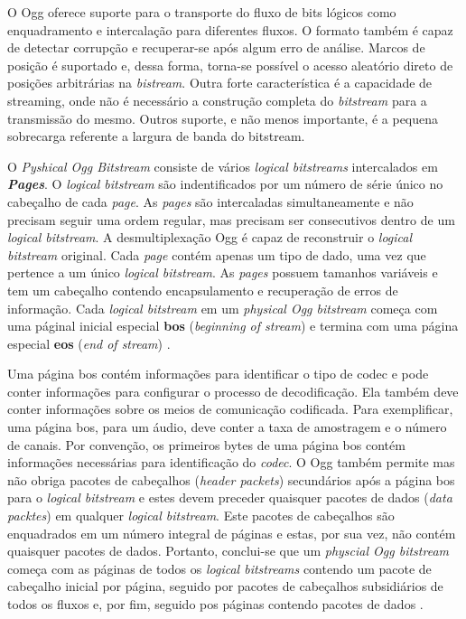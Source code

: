 O Ogg oferece suporte para o transporte do fluxo de bits lógicos como enquadramento e intercalação para diferentes fluxos. O formato também é capaz de detectar corrupção e recuperar-se após algum erro de análise. Marcos de posição é suportado e, dessa forma, torna-se possível o acesso aleatório direto de posições arbitrárias na \textit{bistream}. Outra forte característica é a capacidade de streaming, onde não é necessário a construção completa do \textit{bitstream} para a transmissão do mesmo. Outros suporte, e não menos importante, é a pequena sobrecarga referente a largura de banda do bitstream.

O \textit{Pyshical Ogg Bitstream} consiste de vários \textit{logical bitstreams} intercalados em \textbf{\textit{Pages}}. O \textit{logical bitstream}  são indentificados por um número de série único no cabeçalho de cada \textit{page}. As \textit{pages} são intercaladas simultaneamente e não precisam seguir uma ordem regular, mas precisam ser consecutivos dentro de um \textit{logical bitstream}. A desmultiplexação Ogg é capaz de reconstruir o \textit{logical bitstream} original. Cada \textit{page} contém apenas um tipo de dado, uma vez que pertence a um único \textit{logical bitstream}. As \textit{pages} possuem tamanhos variáveis e tem um cabeçalho contendo encapsulamento e recuperação de erros de informação. Cada \textit{logical bitstream} em um \textit{physical Ogg bitstream} começa com uma páginal inicial especial \textbf{bos} (\textit{beginning of stream}) e termina com uma página especial \textbf{eos} (\textit{end of stream}) \cite{ogg}.

Uma página bos contém informações para identificar o tipo de codec e pode conter informações para configurar o processo de decodificação. Ela também deve conter informações sobre os meios de comunicação codificada. Para exemplificar, uma página bos, para um áudio, deve conter a taxa de amostragem e o número de canais. Por convenção, os primeiros bytes de uma página bos contém informações necessárias para identificação do \textit{codec}. O Ogg também permite mas não obriga pacotes de cabeçalhos (\textit{header packets}) secundários após a página bos para o \textit{logical bitstream} e estes devem preceder quaisquer pacotes de dados (\textit{data packtes}) em qualquer \textit{logical bitstream}. Este pacotes de cabeçalhos são enquadrados em um número integral de páginas e estas, por sua vez, não contém quaisquer pacotes de dados. Portanto, conclui-se que um \textit{physcial Ogg bitstream} começa com as páginas de todos os \textit{logical bitstreams} contendo um pacote de cabeçalho inicial por página, seguido por pacotes de cabeçalhos subsidiários  de todos os fluxos e, por fim, seguido pos páginas contendo pacotes de dados \cite{ogg}.

